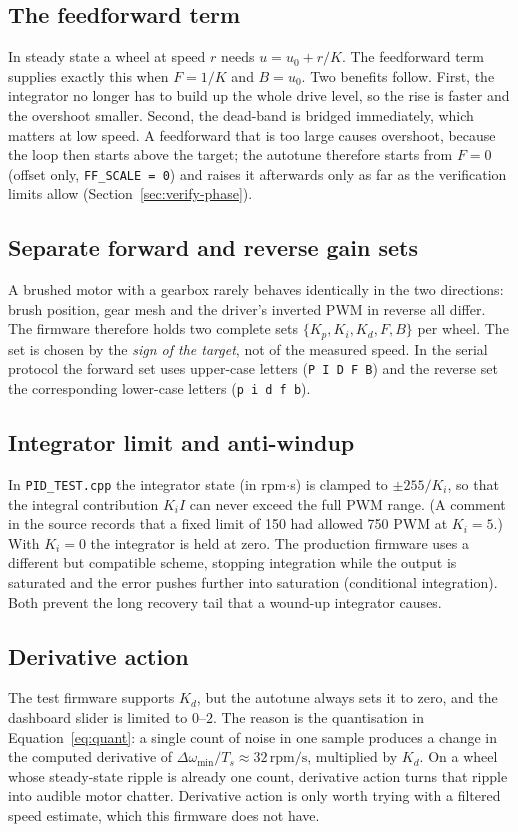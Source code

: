 \documentclass[11pt,a4paper]{report}
\newcommand{\code}[1]{\texttt{#1}}
\newcommand{\rpm}{\,\mathrm{rpm}}
\begin{document}
\subsection{The feedforward term}
In steady state a wheel at speed $r$ needs $u = u_0 + r/K$. The feedforward term supplies exactly this when $F = 1/K$ and $B = u_0$. Two benefits follow. First, the integrator no longer has to build up the whole drive level, so the rise is faster and the overshoot smaller. Second, the dead-band is bridged immediately, which matters at low speed. A feedforward that is too large causes overshoot, because the loop then starts above the target; the autotune therefore starts from $F=0$ (offset only, \code{FF\_SCALE = 0}) and raises it afterwards only as far as the verification limits allow (Section~\ref{sec:verify-phase}).

\subsection{Separate forward and reverse gain sets}
A brushed motor with a gearbox rarely behaves identically in the two directions: brush position, gear mesh and the driver's inverted PWM in reverse all differ. The firmware therefore holds two complete sets $\{K_p,K_i,K_d,F,B\}$ per wheel. The set is chosen by the \emph{sign of the target}, not of the measured speed. In the serial protocol the forward set uses upper-case letters (\code{P I D F B}) and the reverse set the corresponding lower-case letters (\code{p i d f b}).

\subsection{Integrator limit and anti-windup}
In \code{PID\_TEST.cpp} the integrator state (in rpm$\cdot$s) is clamped to $\pm 255/K_i$, so that the integral contribution $K_i I$ can never exceed the full PWM range. (A comment in the source records that a fixed limit of 150 had allowed 750 PWM at $K_i=5$.) With $K_i = 0$ the integrator is held at zero. The production firmware uses a different but compatible scheme, stopping integration while the output is saturated and the error pushes further into saturation (conditional integration). Both prevent the long recovery tail that a wound-up integrator causes.

\subsection{Derivative action}
The test firmware supports $K_d$, but the autotune always sets it to zero, and the dashboard slider is limited to $0$--$2$. The reason is the quantisation in Equation~\eqref{eq:quant}: a single count of noise in one sample produces a change in the computed derivative of $\Delta\omega_{\min}/T_s \approx 32\rpm/\mathrm{s}$, multiplied by $K_d$. On a wheel whose steady-state ripple is already one count, derivative action turns that ripple into audible motor chatter. Derivative action is only worth trying with a filtered speed estimate, which this firmware does not have.
\end{document}
